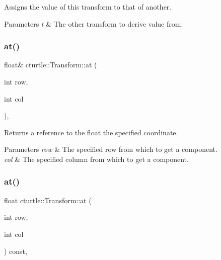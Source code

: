 Assigns the value of this transform to that of another. 


\begin{DoxyParams}{Parameters}
{\em t} & The other transform to derive value from. \\
\hline
\end{DoxyParams}
\mbox{\label{classcturtle_1_1Transform_a640a1e38d034eb0b3878c4c56f014dd2}} 
\subsubsection{\texorpdfstring{at()}{at()}\hspace{0.1cm}{\footnotesize\ttfamily [1/2]}}
{\footnotesize\ttfamily float\& cturtle\+::\+Transform\+::at (\begin{DoxyParamCaption}\item[{int}]{row,  }\item[{int}]{col }\end{DoxyParamCaption})\hspace{0.3cm}{\ttfamily [inline]}, {\ttfamily [protected]}}



Returns a reference to the float the specified coordinate. 


\begin{DoxyParams}{Parameters}
{\em row} & The specified row from which to get a component. \\
\hline
{\em col} & The specified column from which to get a component. \\
\hline
\end{DoxyParams}
\mbox{\label{classcturtle_1_1Transform_af6ab44503dfb32a56bbce3c8b2b5ea97}} 
\subsubsection{\texorpdfstring{at()}{at()}\hspace{0.1cm}{\footnotesize\ttfamily [2/2]}}
{\footnotesize\ttfamily float cturtle\+::\+Transform\+::at (\begin{DoxyParamCaption}\item[{int}]{row,  }\item[{int}]{col }\end{DoxyParamCaption}) const\hspace{0.3cm}{\ttfamily [inline]}, {\ttfamily [protected]}}



